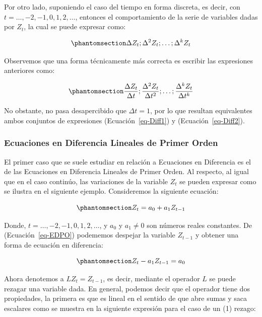 \documentclass[
  a4paper,
]{article}
\begin{document}
Por otro lado, suponiendo el caso del tiempo en forma discreta, es
decir, con \(t = \ldots, -2, -1, 0, 1, 2, \ldots\), entonces el
comportamiento de la serie de variables dadas por \(Z_t\), la cual se
puede expresar como:

\begin{equation}\phantomsection\label{eq-Diff1}{
    \Delta Z_t; \Delta^2 Z_t; \ldots; \Delta^k Z_t
}\end{equation}

Observemos que una forma técnicamente más correcta es escribir las
expresiones anteriores como:

\begin{equation}\phantomsection\label{eq-Diff2}{
    \frac{\Delta Z_t}{\Delta t}; \frac{\Delta^2 Z_t}{\Delta t^2}; \ldots; \frac{\Delta^k Z_t}{\Delta t^k}
}\end{equation}

No obstante, no pasa desapercibido que \(\Delta t = 1\), por lo que
resultan equivalentes ambos conjuntos de expresiones
(Ecuación~\ref{eq-Diff1}) y (Ecuación~\ref{eq-Diff2}).

\subsubsection{Ecuaciones en Diferencia Lineales de Primer
Orden}\label{ecuaciones-en-diferencia-lineales-de-primer-orden}

El primer caso que se suele estudiar en relación a Ecuaciones en
Diferencia es el de las Ecuaciones en Diferencia Lineales de Primer
Orden. Al respecto, al igual que en el caso continúo, las variaciones de
la variable \(Z_t\) se pueden expresar como se ilustra en el siguiente
ejemplo. Consideremos la siguiente ecuación:

\begin{equation}\phantomsection\label{eq-EDPO}{
    Z_t = a_0 + a_1 Z_{t-1}
}\end{equation}

Donde, \(t = \ldots, -2, -1, 0, 1, 2, \ldots\), y \(a_0\) y
\(a_1 \neq 0\) son números reales constantes. De
(Ecuación~\ref{eq-EDPO}) podememos despejar la variable \(Z_{t-1}\) y
obtener una forma de ecuación en diferencia:

\begin{equation}\phantomsection\label{eq-EDPO2}{
    Z_t - a_1 Z_{t-1} = a_0
}\end{equation}

Ahora denotemos a \(L Z_t = Z_{t-1}\), es decir, mediante el operador
\(L\) se puede rezagar una variable dada. En general, podemos decir que
el operador tiene dos propiedades, la primera es que es lineal en el
sentido de que abre sumas y saca escalares como se muestra en la
siguiente expresión para el caso de un (1) rezago:
\end{document}
